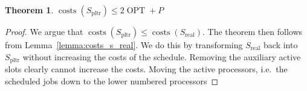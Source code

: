 \documentclass[a4paper]{article}
\DeclareMathOperator{\costs}{costs}
\DeclareMathOperator{\opt}{OPT}
\DeclareMathOperator{\PLTR}{pltr}
\DeclareMathOperator{\real}{real}
\newtheorem{theorem}{Theorem}
\begin{document}
\begin{theorem}
  $\costs(S_{\PLTR}) \leq 2 \opt + P$
\end{theorem}
\begin{proof}
  We argue that $\costs(S_{\PLTR}) \leq \costs(S_{\real})$.
  The theorem then follows from Lemma~\ref{lemma:costs_s_real}.
  We do this by transforming $S_{\real}$ back into $S_{\PLTR}$ without increasing the costs of the schedule.
  Removing the auxiliary active slots clearly cannot increase the costs.
  Moving the active processors, i.e.\ the scheduled jobs down to the lower numbered processors
\end{proof}



%


\end{document}
